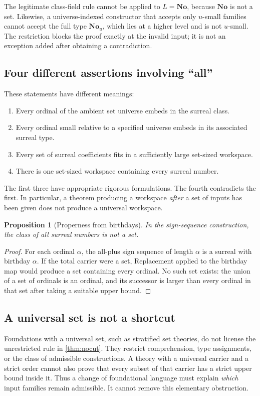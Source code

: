 \documentclass[11pt,letterpaper]{article}
\numberwithin{equation}{section}
\newtheorem{proposition}[theorem]{Proposition}
\theoremstyle{definition}
\theoremstyle{remark}
\newcommand{\No}{\mathbf{No}}
\begin{document}
The legitimate class-field rule cannot be applied to $L=\No$, because $\No$ is not a set. Likewise, a universe-indexed constructor that accepts only $u$-small families cannot accept the full type $\No_u$, which lies at a higher level and is not $u$-small. The restriction blocks the proof exactly at the invalid input; it is not an exception added after obtaining a contradiction.

\subsection{Four different assertions involving ``all''}
These statements have different meanings:
\begin{enumerate}
\item Every ordinal of the ambient set universe embeds in the surreal class.
\item Every ordinal small relative to a specified universe embeds in its associated surreal type.
\item Every set of surreal coefficients fits in a sufficiently large set-sized workspace.
\item There is one set-sized workspace containing every surreal number.
\end{enumerate}
The first three have appropriate rigorous formulations. The fourth contradicts the first. In particular, a theorem producing a workspace \emph{after} a set of inputs has been given does not produce a universal workspace.

\begin{proposition}[Properness from birthdays]\label{prop:proper}
In the sign-sequence construction, the class of all surreal numbers is not a set.
\end{proposition}
\begin{proof}
For each ordinal $\alpha$, the all-plus sign sequence of length $\alpha$ is a surreal with birthday $\alpha$. If the total carrier were a set, Replacement applied to the birthday map would produce a set containing every ordinal. No such set exists: the union of a set of ordinals is an ordinal, and its successor is larger than every ordinal in that set after taking a suitable upper bound.
\end{proof}

\subsection{A universal set is not a shortcut}
Foundations with a universal set, such as stratified set theories, do not license the unrestricted rule in \cref{thm:nocut}. They restrict comprehension, type assignments, or the class of admissible constructions. A theory with a universal carrier and a strict order cannot also prove that every subset of that carrier has a strict upper bound inside it. Thus a change of foundational language must explain \emph{which} input families remain admissible. It cannot remove this elementary obstruction.
\end{document}
